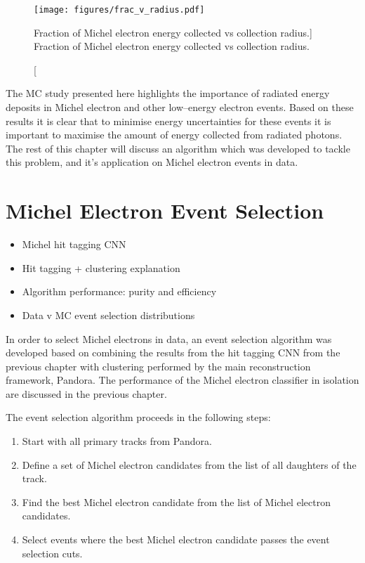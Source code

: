 \begin{figure}
	\centering
	\texttt{[image: figures/frac\_v\_radius.pdf]}
	\caption
	[Fraction of Michel electron energy collected vs collection radius.]
	{Fraction of Michel electron energy collected vs collection radius.}
	\label{fig:frac_v_radius}
\end{figure}

The MC study presented here highlights the importance of radiated energy
deposits in Michel electron and other low--energy electron events. Based on
these results it is clear that to minimise energy uncertainties for these events
it is important to maximise the amount of energy collected from radiated 
photons. The rest of this chapter will discuss an algorithm which was developed 
to tackle this problem, and it's application on Michel electron events in 
\protodune{} data.

\section{Michel Electron Event Selection} \label{ME_ES}
\begin{mccorrection}
	\begin{itemize}
	\item Michel hit tagging CNN
	\item Hit tagging + clustering explanation
	\item Algorithm performance: purity and efficiency
	\item Data v MC event selection distributions
	\end{itemize}
\end{mccorrection}

In order to select Michel electrons in \protodune{} data, an event selection
algorithm was developed based on combining the results from the hit tagging CNN 
from the previous chapter with clustering performed by the main \protodune{} 
reconstruction framework, Pandora. The performance of the Michel electron 
classifier in isolation are discussed in the previous chapter.

The event selection algorithm proceeds in the following steps:
\begin{enumerate}
	\item Start with all primary tracks from Pandora.
	\item Define a set of Michel electron candidates from the list of all
		daughters of the track.
	\item Find the best Michel electron candidate from the list of Michel electron
		candidates.
	\item Select events where the best Michel electron candidate passes the event
		selection cuts.
\end{enumerate}

